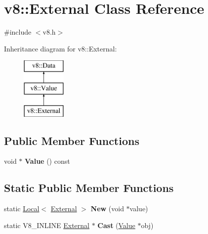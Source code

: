 \hypertarget{classv8_1_1_external}{}\section{v8\+:\+:External Class Reference}
\label{classv8_1_1_external}


{\ttfamily \#include $<$v8.\+h$>$}

Inheritance diagram for v8\+:\+:External\+:\begin{figure}[H]
\begin{center}
\leavevmode
\includegraphics[height=3.000000cm]{classv8_1_1_external}
\end{center}
\end{figure}
\subsection*{Public Member Functions}
\begin{DoxyCompactItemize}
\item 
\hypertarget{classv8_1_1_external_ac2733ee14b5b26f369e5a335c0fe3301}{}void $\ast$ {\bfseries Value} () const \label{classv8_1_1_external_ac2733ee14b5b26f369e5a335c0fe3301}

\end{DoxyCompactItemize}
\subsection*{Static Public Member Functions}
\begin{DoxyCompactItemize}
\item 
\hypertarget{classv8_1_1_external_ac870380e98927cd1e90551d7e47b8713}{}static \hyperlink{classv8_1_1_local}{Local}$<$ \hyperlink{classv8_1_1_external}{External} $>$ {\bfseries New} (void $\ast$value)\label{classv8_1_1_external_ac870380e98927cd1e90551d7e47b8713}

\item 
\hypertarget{classv8_1_1_external_a4711aba26710c5dd72f11cb81808f9c2}{}static V8\+\_\+\+I\+N\+L\+I\+N\+E \hyperlink{classv8_1_1_external}{External} $\ast$ {\bfseries Cast} (\hyperlink{classv8_1_1_value}{Value} $\ast$obj)\label{classv8_1_1_external_a4711aba26710c5dd72f11cb81808f9c2}

\end{DoxyCompactItemize}


